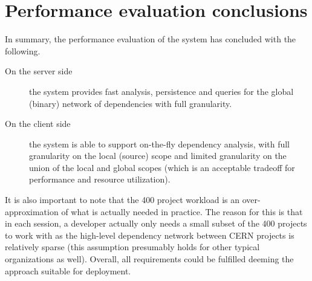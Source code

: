\section{Performance evaluation conclusions}
In summary, the performance evaluation of the system has concluded with the following.
\begin{description}
\item[On the server side] the system provides fast analysis, persistence and
queries for the global (binary) network of dependencies with full granularity.
\item[On the client side] the system is able to support on-the-fly dependency
analysis, with full granularity on the local (source) scope and limited
granularity on the union of the local and global scopes (which is an acceptable
tradeoff for performance and resource utilization).
\end{description}

It is also important to note that the 400 project workload is an
over-approximation of what is actually needed in practice. The reason for this
is that in each session, a developer actually only needs a small subset of the
400 projects to work with as the high-level dependency network between CERN
projects is relatively sparse (this assumption presumably holds for other
typical organizations as well). Overall, all requirements could be fulfilled
deeming the approach suitable for deployment.

